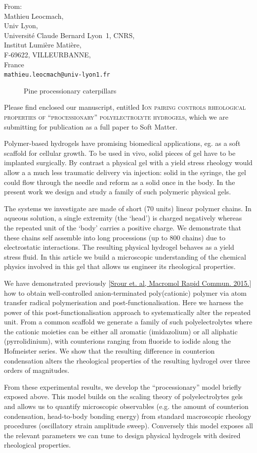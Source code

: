 \documentclass[a4paper, parskip=true, firsthead=false, fromemail=true, foldmarks=false]{scrlttr2}
\newcommand{\journal}{Soft Matter}
\begin{document}
\begin{letter}{From:\\
Mathieu Leocmach,\\
Univ Lyon,\\ 
Universit\'e Claude Bernard Lyon~1, CNRS,\\
Institut Lumi\`ere Mati\`ere,\\
F-69622, VILLEURBANNE,\\
France\\
\texttt{mathieu.leocmach@univ-lyon1.fr}
}
\begin{figure}
\raggedright
Pine processionary caterpillars
\end{figure}

Please find enclosed our manuscript, entitled \textsc{Ion pairing controls rheological properties of ``processionary'' polyelectrolyte hydrogels}, which we are submitting for publication as a full paper to \journal.

Polymer-based hydrogels have promising biomedical applications, eg. as a soft scaffold for cellular growth. To be used in vivo, solid pieces of gel have to be implanted surgically. By contrast a physical gel with a yield stress rheology would allow a a much less traumatic delivery via injection: solid in the syringe, the gel could flow through the needle and reform as a solid once in the body. In the present work we design and study a family of such polymeric physical gels.

The systems we investigate are made of short (70 units) linear polymer chains. In aqueous solution, a single extremity (the `head') is charged negatively whereas the repeated unit of the `body' carries a positive charge. We demonstrate that these chains self assemble into long processions (up to 800 chains) due to electrostatic interactions. %
The resulting physical hydrogel behaves as a yield stress fluid. In this article we build a microscopic understanding of the chemical physics involved in this gel that allows us engineer its rheological properties.

We have demonstrated previously [\href{ https://doi.org/10.1002/marc.201400478}{Srour et. al, Macromol Rapid Commun. 2015.}] how to obtain well-controlled anion-terminated poly(cationic) polymer via atom transfer radical polymerisation and post-functionalisation. Here we harness the power of this post-functionalisation approach to systematically alter the repeated unit. From a common scaffold we generate a family of such polyelectrolytes where the cationic moieties can be either all aromatic (imidazolium) or all aliphatic (pyrrolidinium), with counterions ranging from fluoride to iodide along the Hofmeister series. We show that the resulting difference in counterion condensation alters the rheological properties of the resulting hydrogel over three orders of magnitudes.

From these experimental results, we develop the ``processionary'' model briefly exposed above. This model builds on the scaling theory of polyelectrolytes gels and allows us to quantify microscopic observables (e.g. the amount of counterion condensation, head-to-body bonding energy) from standard macroscopic rheology procedures (oscillatory strain amplitude sweep). Conversely this model exposes all the relevant parameters we can tune to design physical hydrogels with desired rheological properties.



\end{letter}
\end{document}
